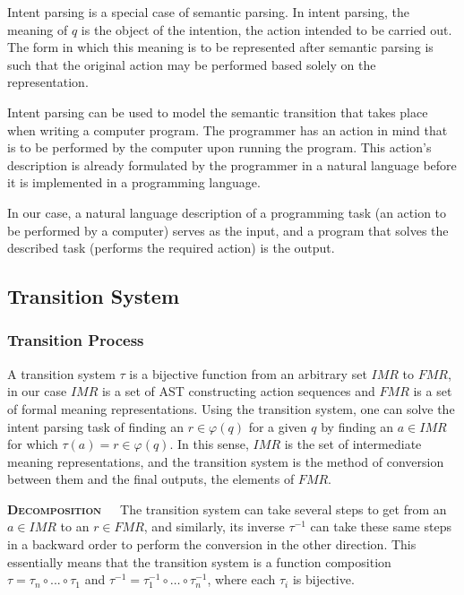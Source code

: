 Intent parsing is a special case of semantic parsing. In intent parsing, the meaning of 
\(q\) is the object of the intention, the action intended to be carried out. The form in 
which this meaning is to be represented after semantic parsing is such that the original 
action may be performed based solely on the representation.

Intent parsing can be used to model the semantic transition that takes place when writing
a computer program. The programmer has an action in mind that is to be performed by the
computer upon running the program. This action's description is already formulated by
the programmer in a natural language before it is implemented in a programming language.

In our case, a natural language description of a programming task (an action to be
performed by a computer) serves as the input, and a program that solves the described
task (performs the required action) is the output.

\subsection{Transition System}

\subsubsection{Transition Process}

A transition system \(\tau\) is a bijective function from an arbitrary set \(IMR\) to \(FMR\),
in our case \(IMR\) is a set of AST constructing action sequences and \(FMR\) is a set of formal
meaning representations. Using the transition system, one can solve the intent parsing task of
finding an \(r \in \varphi(q)\) for a given \(q\) by finding an \(a \in IMR\) for which
\(\tau(a) = r \in \varphi(q)\). In this sense, \(IMR\) is the set of intermediate meaning
representations, and the transition system is the method of conversion between them and the
final outputs, the elements of \(FMR\).

\textbf{\textsc{Decomposition}}\ \ \ The transition system can take several steps to get
from an \(a \in IMR\) to an \(r \in FMR\), and similarly, its inverse \(\tau^{-1}\)
can take these same steps in a backward order to perform the conversion in the other direction.
This essentially means that the transition system is a function composition
\(\tau = \tau_{n} \circ ... \circ \tau_{1}\) and \(\tau^{-1} = \tau_{1}^{-1} \circ \dots 
\circ \tau_{n}^{-1}\), where each \(\tau_{i}\) is bijective.

